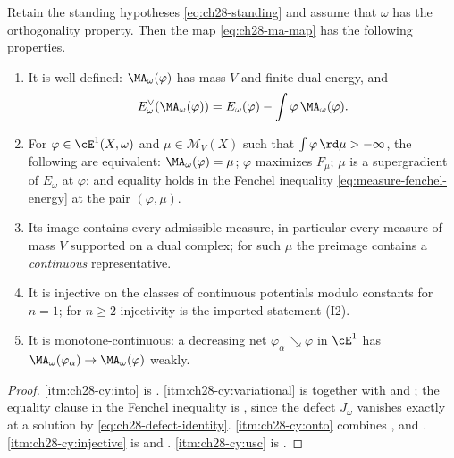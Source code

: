\begin{theorem}
\label{thm:ch28-calabi-yau}
Retain the standing hypotheses \eqref{eq:ch28-standing} and assume that
\(\omega\) has the orthogonality property.  Then the map
\eqref{eq:ch28-ma-map} has the following properties.
\begin{enumerate}
\item\label{itm:ch28-cy:into}
 It is well defined: \(\MA_\omega(\varphi)\) has mass \(V\) and finite dual
 energy, and
 \[
  E^\vee_\omega(\MA_\omega(\varphi))
  =E_\omega(\varphi)-\int\varphi\,\MA_\omega(\varphi).
 \]
\item\label{itm:ch28-cy:variational}
 For \(\varphi\in\cE^1(X,\omega)\) and \(\mu\in\mathcal M_V(X)\) such
 that \(\int\varphi\,\rd\mu> -\infty\), the following are equivalent:
 \(\MA_\omega(\varphi)=\mu\); \(\varphi\)
 maximizes \(F_\mu\); \(\mu\) is a supergradient of \(E_\omega\) at
 \(\varphi\); and equality holds in the Fenchel inequality
 \eqref{eq:measure-fenchel-energy} at the pair \((\varphi,\mu)\).
\item\label{itm:ch28-cy:onto}
 Its image contains every admissible measure, in particular every measure of
 mass \(V\) supported on a dual complex; for such \(\mu\) the preimage
 contains a \emph{continuous} representative.
\item\label{itm:ch28-cy:injective}
 It is injective on the classes of continuous potentials modulo constants
 for \(n=1\); for \(n\geq2\) injectivity is the imported statement
 \textup{(I2)}.
\item\label{itm:ch28-cy:usc}
 It is monotone-continuous: a decreasing net
 \(\varphi_\alpha\searrow\varphi\) in \(\cE^1\) has
 \(\MA_\omega(\varphi_\alpha)\to\MA_\omega(\varphi)\) weakly.
\end{enumerate}
\end{theorem}

\begin{proof}
\cref{itm:ch28-cy:into} is .
\cref{itm:ch28-cy:variational} is
 together with
 and
; the equality clause in the
Fenchel inequality is , since the defect
\(J_\omega\) vanishes exactly at a solution by
\eqref{eq:ch28-defect-identity}.  \cref{itm:ch28-cy:onto} combines
,
 and
.  \cref{itm:ch28-cy:injective} is
 and
.  \cref{itm:ch28-cy:usc} is
.
\end{proof}

